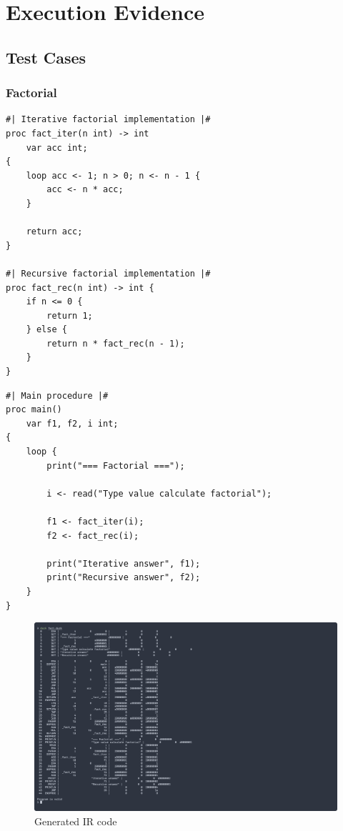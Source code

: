 
\chapter{Execution Evidence}

\section{Test Cases}

\subsection{Factorial}

\begin{verbatim}
#| Iterative factorial implementation |#
proc fact_iter(n int) -> int 
    var acc int;
{
    loop acc <- 1; n > 0; n <- n - 1 {
        acc <- n * acc;
    }
    
    return acc;
}

#| Recursive factorial implementation |#
proc fact_rec(n int) -> int {
    if n <= 0 {
        return 1;
    } else {
        return n * fact_rec(n - 1);
    }
}
\end{verbatim}

\newpage

\begin{verbatim}
#| Main procedure |#
proc main() 
    var f1, f2, i int;
{
    loop {
        print("=== Factorial ===");

        i <- read("Type value calculate factorial");

        f1 <- fact_iter(i);
        f2 <- fact_rec(i);

        print("Iterative answer", f1);
        print("Recursive answer", f2);
    }
}
\end{verbatim}

\begin{figure}[h]
    \centering
    \caption{Generated IR code}
    \includegraphics[width=\textwidth]{evidences/fact_ir}
\end{figure}

